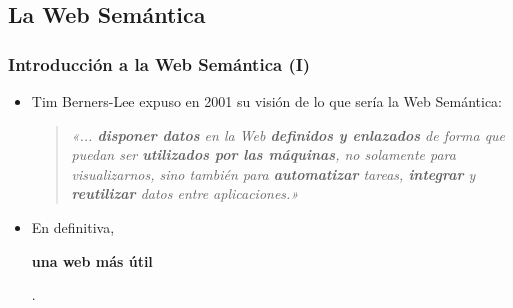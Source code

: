\documentclass[spanish,notes=hide]{beamer}
\begin{document}
\subsection{La Web Semántica}
\frame
{
  \frametitle{Introducción a la Web Semántica (I)}

  \begin{itemize}
   \item<1-> Tim Berners-Lee expuso en 2001 su visión de lo que sería la Web Semántica:
     \begin{quote}
	\emph{«... \textbf{disponer datos} en la Web \textbf{definidos y enlazados} 
	de forma que puedan ser \textbf{utilizados por las máquinas}, no solamente 
	para visualizarnos, sino también para \textbf{automatizar} tareas, 
	\textbf{integrar} y \textbf{reutilizar} datos entre aplicaciones.»}
     \end{quote}
   \vspace{0.5cm}
   \item<2-> En definitiva, \begin{Large}\textbf{una web más útil}\end{Large}.
  \end{itemize}
}
\frame
\end{document}
